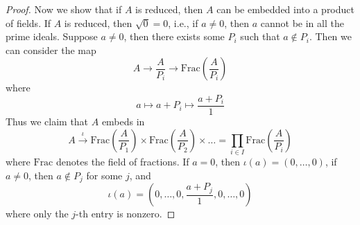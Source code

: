 \documentclass[openany]{book}
\begin{document}
\begin{proof}
    Now we show that if $A$ is reduced, then $A$ can be embedded into a product of fields. If $A$ is reduced, then $\sqrt{0}=0$, i.e., if $a\neq0$, then $a$ cannot be in all the prime ideals. Suppose $a\neq 0$, then there exists some $P_i$ such that $a\not\in P_i$. Then we can consider the map 
    \begin{equation*}
        A\to \frac{A}{P_i}\to\text{Frac}\left( \frac{A}{P_i}\right)
    \end{equation*}
    where 
    \begin{equation*}
        a\mapsto a+P_i\mapsto \frac{a+P_i}{1}
    \end{equation*}
    Thus we claim that $A$ embeds in 
    \begin{equation*}
        A\xrightarrow{\iota}\text{Frac}\left( \frac{A}{P_1}\right)\times \text{Frac}\left( \frac{A}{P_2}\right)\times\dots=\prod_{i\in I}\text{Frac}\left( \frac{A}{P_i}\right)
    \end{equation*}
    where $\text{Frac}$ denotes the field of fractions. If $a=0$, then $\iota(a)=(0,\dots, 0)$, if $a\neq 0$, then $a\not\in P_j$ for some $j$, and 
    \begin{equation*}
        \iota(a)=\left(0,\dots, 0, \frac{a+P_j}{1},0,\dots, 0\right)
    \end{equation*}
    where only the $j$-th entry is nonzero.
\end{proof}
\end{document}
